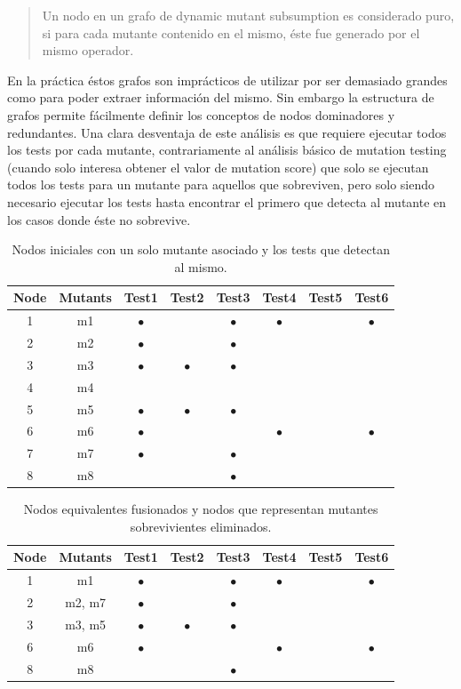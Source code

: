 \begin{quote}
	Un nodo en un grafo de dynamic mutant subsumption es considerado puro, si para cada mutante contenido en el mismo, \'este fue generado por el mismo operador.
\end{quote}
En la pr\'actica \'estos grafos son impr\'acticos de utilizar por ser demasiado grandes como para poder extraer informaci\'on del mismo. Sin embargo la estructura de grafos permite f\'acilmente definir los conceptos de nodos dominadores y redundantes.
Una clara desventaja de este an\'alisis es que requiere ejecutar todos los tests por cada mutante, contrariamente al an\'alisis b\'asico de mutation testing (cuando solo interesa obtener el valor de mutation score) que solo se ejecutan todos los tests para un mutante para aquellos que sobreviven, pero solo siendo necesario ejecutar los tests hasta encontrar el primero que detecta al mutante en los casos donde \'este no sobrevive.

\begin{table}[]
	\centering
	\begin{tabular}{|cccccccc|}
		\hline
		Node & Mutants & Test1 & Test2 & Test3 & Test4 & Test5 & Test6 \\ \hline
		1 & m1 & $\bullet$ &  & $\bullet$ & $\bullet$ &  & $\bullet$ \\ \hline
		2 & m2 & $\bullet$ &  & $\bullet$ &  &  &  \\ \hline
		3 & m3 & $\bullet$ & $\bullet$ & $\bullet$ &  &  &  \\ \hline
		4 & m4 &  &  &  &  &  &  \\ \hline
		5 & m5 & $\bullet$ & $\bullet$ & $\bullet$ &  &  &  \\ \hline
		6 & m6 & $\bullet$ &  &  & $\bullet$ &  & $\bullet$ \\ \hline
		7 & m7 & $\bullet$ &  & $\bullet$ &  &  &  \\ \hline
		8 & m8 &  &  & $\bullet$ &  &  &  \\ \hline
	\end{tabular}
	\caption{Nodos iniciales con un solo mutante asociado y los tests que detectan al mismo.}
	\label{tables.examples.subsumptionInit}
\end{table}

\begin{table}[]
	\centering
	\begin{tabular}{|cccccccc|}
		\hline
		Node & Mutants & Test1 & Test2 & Test3 & Test4 & Test5 & Test6 \\ \hline
		1 & m1 & $\bullet$ &  & $\bullet$ & $\bullet$ &  & $\bullet$ \\ \hline
		2 & m2, m7 & $\bullet$ &  & $\bullet$ &  &  &  \\ \hline
		3 & m3, m5 & $\bullet$ & $\bullet$ & $\bullet$ &  &  &  \\ \hline
		6 & m6 & $\bullet$ &  &  & $\bullet$ &  & $\bullet$ \\ \hline
		8 & m8 &  &  & $\bullet$ &  &  &  \\ \hline
	\end{tabular}
	\caption{Nodos equivalentes fusionados y nodos que representan mutantes sobrevivientes eliminados.}
	\label{tables.examples.subsumptionEquivAndKilled}
\end{table}

